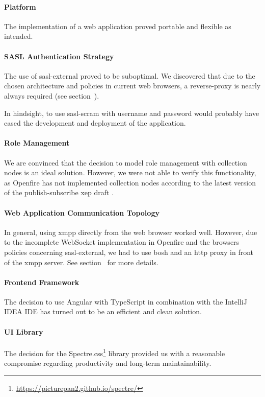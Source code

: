 \paragraph{Platform}
The implementation of a web application proved portable and flexible as intended.

\paragraph{SASL Authentication Strategy}
The use of \gls{sasl-external} proved to be suboptimal.
We discovered that due to the chosen architecture and policies in current web browsers, a reverse-proxy is nearly always required (see section~).

In hindsight, to use \gls{sasl-scram} with username and password would probably have eased the development and deployment of the application.

\paragraph{Role Management}
We are convinced that the decision to model role management with collection nodes is an ideal solution.
However, we were not able to verify this functionality, as Openfire has not implemented collection nodes according to the latest version of the \gls{publish-subscribe} \gls{xep} draft \cite{xep-0248}.

\paragraph{Web Application Communication Topology}
In general, using \gls{xmpp} directly from the web browser worked well.
However, due to the incomplete WebSocket implementation in Openfire and the browsers policies concerning \gls{sasl-external}, we had to use \gls{bosh} and an \gls{http} proxy in front of the \gls{xmpp} server.
See section~ for more details.

\paragraph{Frontend Framework}
The decision to use Angular with TypeScript in combination with the IntelliJ IDEA IDE has turned out to be an efficient and clean solution.

\paragraph{UI Library}
The decision for the Spectre.css\footnote{\url{https://picturepan2.github.io/spectre/}} library provided us with a reasonable compromise regarding productivity and long-term maintainability.

